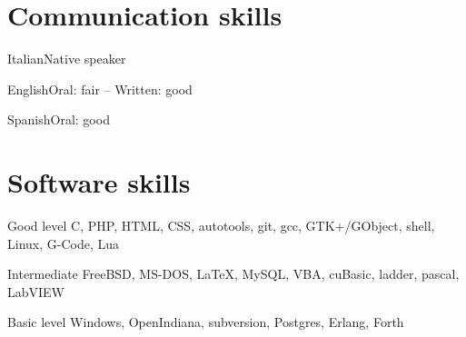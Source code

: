 \documentclass[fontsize=10pt]{tccv}
\begin{document}
\section{Communication skills}

\begin{factlist}
\item{Italian}{Native speaker}
\item{English}{Oral: fair -- Written: good}
\item{Spanish}{Oral: good}
\end{factlist}

\section{Software skills}

\begin{factlist}

\item{Good level}
     {C, PHP, HTML, CSS, autotools, git, gcc, GTK+/GObject, shell,
      Linux, G-Code, Lua}

\item{Intermediate}
     {FreeBSD, MS-DOS, \LaTeX, MySQL, VBA, cuBasic, ladder, pascal,
      LabVIEW}

\item{Basic level}
     {Windows, OpenIndiana, subversion,  Postgres, Erlang, Forth}

\end{factlist}
\end{document}
